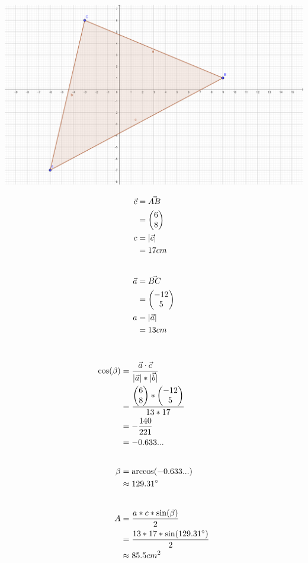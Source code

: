 \documentclass{article}
\begin{document}
\def\BC{\begin{pmatrix}
    -12 \\
    5 \\
\end{pmatrix}}

\def\cosval{-0.633...}
\def\cosang{129.31}
\def\cosanginv{\pgfmathparse{180 - \cosang}\pgfmathresult}
\def\sinofang{\pgfmathparse{sin(\cosang)}\pgfmathresult}
\def\sinofanginv{\pgfmathparse{sin(180 - \cosang)}\pgfmathresult}

\includegraphics[width=\linewidth]{images/8-29-1.png}

\begin{align*}
    \vec{c} &= \vec{AB} \\ 
    &= \AB \\
    c &= |\vec{c}|  \\
    &= 17cm \\[20pt]
    \vec{a} &= \vec{BC} \\
    &= \BC \\
    a &= |\vec{a}| \\
    &= 13cm \\[20pt]
\end{align*}

\begin{align*}
    \cos({\beta}) &= \frac{\vec{a} \cdot \vec{c}}{|\vec{a}| * |\vec{b}|} \\
    &= \frac{\AB * \BC}{13 * 17}  \\
    &= -\frac{140}{221} \\
    &= \cosval \\[20pt]
    \beta &= \arccos(\cosval) \\
    &\approx \cosang^\circ \\[20pt]
    A &= \frac{a * c * \sin({\beta})}{2} \\
    &= \frac{13 * 17 * \sin({\cosang^\circ})}{2} \\
    &\approx 85.5cm^2
\end{align*}
\end{document}
